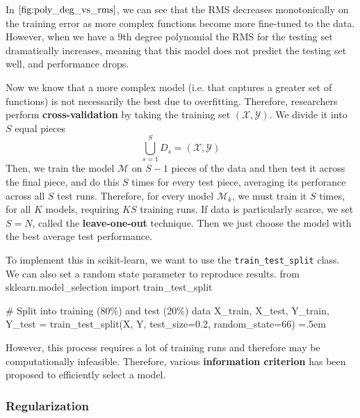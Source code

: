 \documentclass{article}
\newenvironment{cverbatim}
 {\SaveVerbatim{cverb}}
 {\endSaveVerbatim
  \flushleft\fboxrule=0pt\fboxsep=.5em
  \colorbox{cverbbg}{%
    \makebox[\dimexpr\linewidth-2\fboxsep][l]{\BUseVerbatim{cverb}}%
  }
  \endflushleft
}
\theoremstyle{definition}
\theoremstyle{remark}
\theoremstyle{definition}
\begin{document}
In $\ref{fig:poly_deg_vs_rms}$, we can see that the RMS decreases monotonically on the training error as more complex functions become more fine-tuned to the data. However, when we have a $9$th degree polynomial the RMS for the testing set dramatically increases, meaning that this model does not predict the testing set well, and performance drops. 


Now we know that a more complex model (i.e. that captures a greater set of functions) is not necessarily the best due to overfitting. Therefore, researchers perform \textbf{cross-validation} by taking the training set $(\mathcal{X}, \mathcal{Y})$. We divide it into $S$ equal pieces 
\[\bigcup_{s=1}^S D_s = (\mathcal{X}, \mathcal{Y})\]
Then, we train the model $\mathcal{M}$ on $S-1$ pieces of the data and then test it across the final piece, and do this $S$ times for every test piece, averaging its perforance across all $S$ test runs. Therefore, for every model $\mathcal{M}_k$, we must train it $S$ times, for all $K$ models, requiring $KS$ training runs. If data is particularly scarce, we set $S = N$, called the \textbf{leave-one-out} technique. Then we just choose the model with the best average test performance. 

To implement this in scikit-learn, we want to use the \texttt{train\_test\_split} class. We can also set a random state parameter to reproduce results. 
\begin{cverbatim}
from sklearn.model_selection import train_test_split 

# Split into training (80\%) and test (20\%) data 
X_train, X_test, Y_train, Y_test = train_test_split(X, Y, test_size=0.2, 
                                                    random_state=66)
\end{cverbatim}

However, this process requires a lot of training runs and therefore may be computationally infeasible. Therefore, various \textbf{information criterion} has been proposed to efficiently select a model. 


\subsubsection{Regularization}
\end{document}
